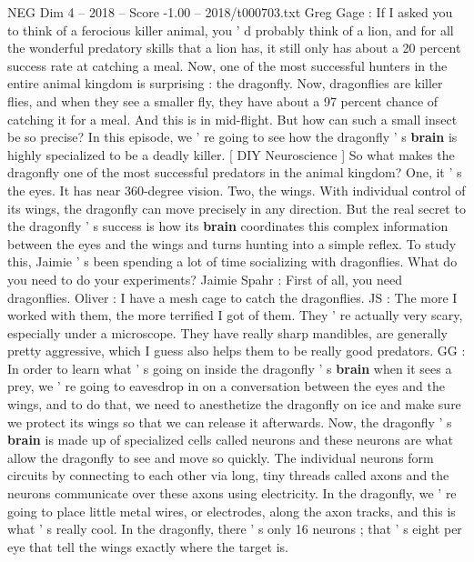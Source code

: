 \begin{textsample}{NEG Dim 4 – 2018 – Score -1.00 – 2018/t000703.txt}  \label{ex:f4_neg_018}
Greg Gage : If I asked you to think of a ferocious killer animal, you ' d probably think of a lion, and for all the wonderful predatory skills that a lion has, it still only has about a 20 percent success rate at catching a meal.
Now, one of the most successful hunters in the entire animal kingdom is surprising : the dragonfly.
Now, dragonflies are killer flies, and when they see a smaller fly, they have about a 97 percent chance of catching it for a meal.
And this is in mid-flight.
But how can such a small insect be so precise?
In this episode, we ' re going to see how the dragonfly ' s \textbf{brain} is highly specialized to be a deadly killer. [ DIY Neuroscience ] So what makes the dragonfly one of the most successful predators in the animal kingdom?
One, it ' s the eyes.
It has near 360-degree vision.
Two, the wings.
With individual control of its wings, the dragonfly can move precisely in any direction.
But the real secret to the dragonfly ' s success is how its \textbf{brain} coordinates this complex information between the eyes and the wings and turns hunting into a simple reflex.
To study this, Jaimie ' s been spending a lot of time socializing with dragonflies.
What do you need to do your experiments?
Jaimie Spahr : First of all, you need dragonflies.
Oliver : I have a mesh cage to catch the dragonflies.
JS : The more I worked with them, the more terrified I got of them.
They ' re actually very scary, especially under a microscope.
They have really sharp mandibles, are generally pretty aggressive, which I guess also helps them to be really good predators.
GG : In order to learn what ' s going on inside the dragonfly ' s \textbf{brain} when it sees a prey, we ' re going to eavesdrop in on a conversation between the eyes and the wings, and to do that, we need to anesthetize the dragonfly on ice and make sure we protect its wings so that we can release it afterwards.
Now, the dragonfly ' s \textbf{brain} is made up of specialized cells called neurons and these neurons are what allow the dragonfly to see and move so quickly.
The individual neurons form circuits by connecting to each other via long, tiny threads called axons and the neurons communicate over these axons using electricity.
In the dragonfly, we ' re going to place little metal wires, or electrodes, along the axon tracks, and this is what ' s really cool.
In the dragonfly, there ' s only 16 neurons ; that ' s eight per eye that tell the wings exactly where the target is.

\end{textsample}

